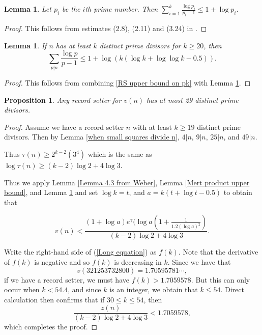 \documentclass{article}
\newtheorem{lemma}[theorem]{Lemma}
\newtheorem{proposition}[theorem]{Proposition}
\begin{document}
\begin{lemma} Let $p_i$ be the $i$th prime number. Then 
$\sum_{i=1}^k \frac{\log p_i}{p_i-1} \leq 1+ \log p_i $.
\label{RS derived estimate for sum of log p / p}
\end{lemma}
\begin{proof} This follows from estimates (2.8), (2.11) and (3.24) in \cite{RosserSchoenfeld1962}.
\end{proof}


\begin{lemma} If $n$ has at least $k$ distinct prime divisors for $k \geq 20$, then \begin{equation} \sum_{p|n} \frac{\log p}{p-1} \leq 1+ \log \left(k(\log  k + \log \log k -0.5)\right). 
\end{equation} \label{sum log p / p p divides n bound}
\end{lemma}
\begin{proof} This follows from combining \ref{RS upper bound on pk}  with Lemma \ref{RS derived estimate for sum of log p / p}.
\end{proof}

\begin{proposition} Any record setter for $v(n)$ has at most 29 distinct prime divisors. \label{Weak initial bound on number of distinct prime divisors of a record setter}
\end{proposition}
\begin{proof} Assume we have a record setter $n$ with at least $k \geq 19$ distinct prime divisors. Then by Lemma \ref{when small squares divide n}, $4|n$, $9|n$, $25|n$, and $49|n$. 

Thus $\tau(n) \geq 2^{k-2}(3^4)$ which is the same as 
$\log \tau(n) \geq (k-2)\log 2 + 4 \log 3$.

Thus we apply Lemma \ref{Lemma 4.3 from Weber}, Lemma \ref{Mert product upper bound}, and  Lemma \ref{sum log p / p p divides n bound} and set $\log k=t$, and $a = k(t + \log t -0.5)$ to obtain that

\begin{equation} v(n) <  \frac{\left(1+ \log a \right)e^\gamma (\log  a\left(1 + \frac{1}{1.2 \left(\log a \right)^2}\right)}{(k-2) \log 2 + 4 \log 3}.  \label{Long equation}
\end{equation}

Write the right-hand side of (\ref{Long equation}) as  $f(k)$. Note that the derivative of $f(k)$ is negative and so $f(k)$ is decreasing in $k$. Since we have that $$v(321253732800)=1.70595781\cdots,$$ if we have a record setter, we must have 
$f(k) > 1.7059578$. But this can only occur when $k< 54.4$, and since $k$ is an integer, we obtain that $k \leq 54$. Direct calculation then confirms that if $30 \leq k \leq 54 $, then $$\frac{z(n)}{(k-2)\log 2 +4 \log 3}< 1.7059578, $$
which completes the proof. 
\end{proof}
\end{document}

